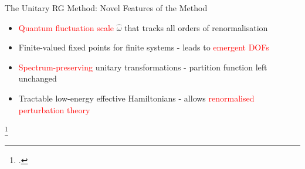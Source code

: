 \documentclass[11pt,aspectratio=169]{beamer}
\newcommand{\focus}[1]{\textcolor{red}{#1}}
\begin{document}
\begin{frame}{The Unitary RG Method: Novel Features of the Method}

\vspace*{\fill}
\begin{itemize}
	\item \focus{Quantum fluctuation scale} \(\hat \omega\)	that tracks all orders of renormalisation\\[15pt]
	\item Finite-valued fixed points for finite systems - leads to \focus{emergent DOFs}\\[15pt]
	\item \focus{Spectrum-preserving} unitary transformations - partition function left unchanged\\[15pt]
	\item Tractable low-energy effective Hamiltonians - allows \focus{renormalised perturbation theory} 
\end{itemize}
\vspace*{\fill}

\footcite{santanukagome,anirbanmott1,anirbanmott2,anirban_mott_ent,1dhubjhep,siddharthacpi,anirban_kondo}
\end{frame}
\end{document}
